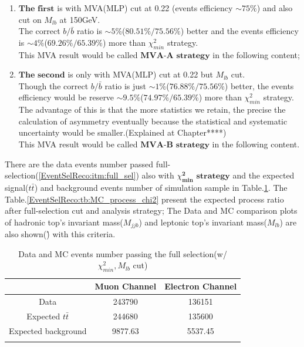 		\begin{enumerate}
			\item $\textbf{The first}$ is with MVA(MLP) cut at 0.22 (events efficiency $\sim 75\%$) and also cut on $M_{lb}$ at 150GeV.\\ 
			The correct $b/\bar{b}$ ratio is $\sim 5 \%$($80.51 \%/75.56 \%$) better and the events efficiency is $\sim 4 \%$($69.26 \%/65.39 \%$) more than $\chi^2_{min}$ strategy.\\
			This MVA result would be called $\textbf{MVA-A}$ $\textbf{strategy}$ in the following content;
			\item $\textbf{The second}$ is only with MVA(MLP) cut at 0.22 but $M_{lb}$ cut. \\
			Though the correct $b/\bar{b}$ ratio is just $\sim 1 \%$($76.88 \%/75.56 \%$) better, the events efficiency would be reserve $\sim 9.5 \%$($74.97 \%/65.39 \%$) more than $\chi^2_{min}$ strategy. The advantage of this is that the more statistics we retain, the precise the calculation of asymmetry eventually because the statistical and systematic uncertainty would be smaller.(Explained at Chapter****)\\
			This MVA result would be called $\textbf{MVA-B}$ $\textbf{strategy}$ in the following content.
		\label{EventSelReco:itm:a05_samples}
		\end{enumerate}


		There are the data events number passed full-selection(\ref{EventSelReco:itm:full_sel}) also with $\chi^{\textbf{2}}_{\textbf{min}}$ $\textbf{strategy}$ and the expected signal($t\bar{t}$) and background events number of simulation sample in Table.\ref{EventSelReco:tb:DataMC_expected_chi2}. The Table.\ref{EventSelReco:tb:MC_process_chi2} present the expected process ratio after full-selection cut and analysis strategy; The Data and MC comparison plots of hadronic top's invariant mass($M_{jjb}$) and leptonic top's invariant mass($M_{lb}$) are also shown(\r) with this criteria.

		\begin{center}
		\begin{longtable}[H]{ c c c }
		\caption{Data and MC events number passing the full selection(w/ $\chi^2_{min}, M_{lb}$ cut)} \\
		\hline
		 & Muon Channel & Electron Channel \\ 
		\hline
		 Data & 243790 & 136151 \\
		\hline
		 Expected $t\bar{t}$ & 244680 & 135600 \\
		 Expected background & 9877.63 & 5537.45 \\
		\hline
		\label{EventSelReco:tb:DataMC_expected_chi2}
		\end{longtable}
		\end{center}
		\FloatBarrier

